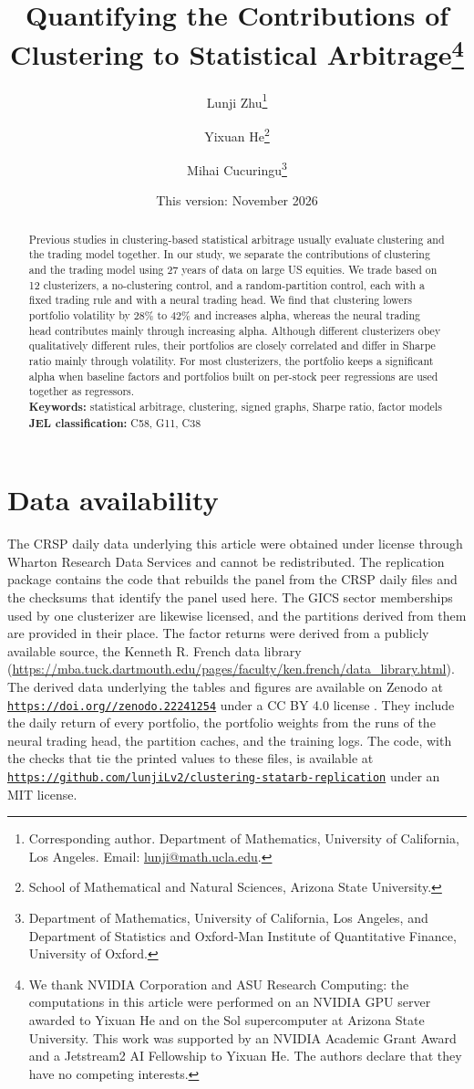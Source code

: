 \documentclass[10pt]{article}
\title{\bfseries Quantifying the Contributions of Clustering to Statistical Arbitrage\thanks{%
We thank NVIDIA Corporation and ASU Research Computing: the computations in this article were performed on an NVIDIA GPU server awarded to Yixuan He and on the Sol supercomputer at Arizona State University. This work was supported by an NVIDIA Academic Grant Award and a Jetstream2 AI Fellowship to Yixuan He. The authors declare that they have no competing interests.}}
\author{%
  Lunji Zhu\thanks{Corresponding author. Department of Mathematics, University of California, Los Angeles. Email: \href{mailto:lunji@math.ucla.edu}{lunji@math.ucla.edu}.}
  \and Yixuan He\thanks{School of Mathematical and Natural Sciences, Arizona State University.}
  \and Mihai Cucuringu\thanks{Department of Mathematics, University of California, Los Angeles, and Department of Statistics and Oxford-Man Institute of Quantitative Finance, University of Oxford.}%
}
\date{This version: November 2026}
\providecommand*{\ZenodoDOI}{10.5281/zenodo.22241254}
\begin{document}
\maketitle

\begin{abstract}
\noindent
Previous studies in clustering-based statistical arbitrage usually evaluate clustering and the trading model together. In our study, we separate the contributions of clustering and the trading model using 27 years of data on large US equities. We trade based on 12 clusterizers, a no-clustering control, and a random-partition control, each with a fixed trading rule and with a neural trading head. We find that clustering lowers portfolio volatility by $28\%$ to $42\%$ and increases alpha, whereas the neural trading head contributes mainly through increasing alpha. Although different clusterizers obey qualitatively different rules, their portfolios are closely correlated and differ in Sharpe ratio mainly through volatility. For most clusterizers, the portfolio keeps a significant alpha when baseline factors and portfolios built on per-stock peer regressions are used together as regressors.
\\[8pt]
\noindent\textbf{Keywords:} statistical arbitrage, clustering, signed graphs, Sharpe ratio, factor models\\
\noindent\textbf{JEL classification:} C58, G11, C38
\end{abstract}

\thispagestyle{empty}
\clearpage
{}









\section*{Data availability}
The CRSP daily data underlying this article were obtained under license
through Wharton Research Data Services and cannot be redistributed. The
replication package contains the code that rebuilds the panel from the
CRSP daily files and the checksums that identify the panel used here. The
GICS sector memberships used by one clusterizer are likewise licensed, and the
partitions derived from them are provided in their place. The factor
returns were derived from a publicly available source, the Kenneth R.
French data library
(\url{https://mba.tuck.dartmouth.edu/pages/faculty/ken.french/data_library.html}).
The derived data underlying the tables and figures are available on Zenodo at \href{https://doi.org/\ZenodoDOI}{\texttt{https://doi.org/\allowbreak\ZenodoDOI}} under a CC BY 4.0 license \citep{zhu2026replicationdata}. They include the daily return of every portfolio, the portfolio weights from the runs of the neural trading head, the partition caches, and the training logs. The code,
with the checks that tie the printed values to these files, is available
at \href{https://github.com/lunjiLv2/clustering-statarb-replication}{\texttt{https://github.com/lunjiLv2/\allowbreak clustering-statarb-replication}} under an
MIT license.




\begin{appendices}

\end{appendices}
\end{document}
